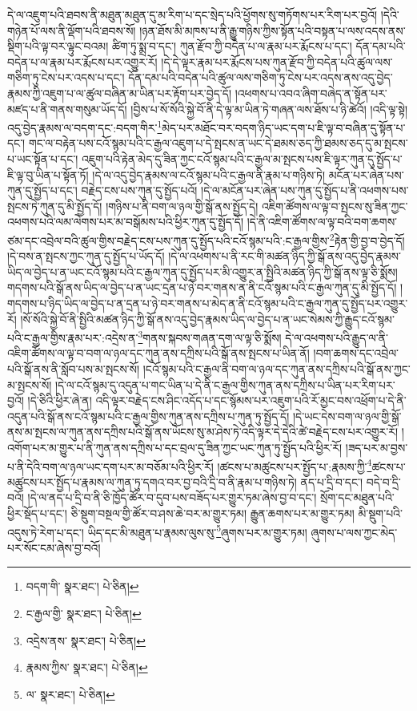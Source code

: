 དེ་ལ་འཇུག་པའི་ཐབས་ནི་མཐུན་མཐུན་དུ་མ་རིག་པ་དང་སྲེད་པའི་ཕྱོགས་སུ་གཏོགས་པར་རིག་པར་བྱའོ། །དེའི་གཉེན་པོ་ལས་ནི་ལྡོག་པའི་ཐབས་སོ། །ཉན་ཐོས་མི་མཁས་པ་ནི་རྒྱུ་གཉིས་ཀྱིས་སྟོན་པའི་བསྟན་པ་ལས་འདས་ནས་སྡིག་པའི་ལྟ་བར་ལྟུང་བའམ། ཚིག་ཏུ་སྨྲ་བ་དང་། ཀུན་རྫོབ་ཀྱི་བདེན་པ་ལ་རྣམ་པར་རྨོངས་པ་དང་། དོན་དམ་པའི་བདེན་པ་ལ་རྣམ་པར་རྨོངས་པར་འགྱུར་རོ། །དེ་དེ་ལྟར་རྣམ་པར་རྨོངས་པས་ཀུན་རྫོབ་ཀྱི་བདེན་པའི་ཚུལ་ལས་གཅིག་ཏུ་ངེས་པར་འདས་པ་དང་། དོན་དམ་པའི་བདེན་པའི་ཚུལ་ལས་གཅིག་ཏུ་ངེས་པར་འདས་ནས་འདུ་བྱེད་རྣམས་ཀྱི་འཇུག་པ་ལ་ཚུལ་བཞིན་མ་ཡིན་པར་རྟོག་པར་བྱེད་དོ། །འཕགས་པ་འབའ་ཞིག་བཞེད་ན་སྟོན་པར་མཛད་པ་ནི་གནས་གསུམ་ཡོད་དོ། །བྱིས་པ་སོ་སོའི་སྐྱེ་བོ་ནི་དེ་ལྟ་མ་ཡིན་ཏེ་གཞན་ལས་ཐོས་པ་ཉི་ཚེའོ། །འདི་ལྟ་སྟེ། འདུ་བྱེད་རྣམས་ལ་བདག་དང་:བདག་གིར་\footnote{བདག་གི་  སྣར་ཐང་།  པེ་ཅིན། }མེད་པར་མཐོང་བར་བདག་ཉིད་ཡང་དག་པ་ཇི་ལྟ་བ་བཞིན་དུ་སྟོན་པ་དང་། གང་ལ་བརྟེན་པས་ངའོ་སྙམ་པའི་ང་རྒྱལ་འཇུག་པ་དེ་སྤངས་ན་ཡང་དེ་ཐམས་ཅད་ཀྱི་ཐམས་ཅད་དུ་མ་སྤངས་པ་ཡང་སྟོན་པ་དང་། འཇུག་པའི་རྟེན་མེད་དུ་ཟིན་ཀྱང་ངའོ་སྙམ་པའི་ང་རྒྱལ་མ་སྤངས་པས་ཇི་ལྟར་ཀུན་དུ་སྤྱོད་པ་ཇི་ལྟ་བུ་ཡིན་པ་སྟོན་ཏོ། །དེ་ལ་འདུ་བྱེད་རྣམས་ལ་ངའོ་སྙམ་པའི་ང་རྒྱལ་ནི་རྣམ་པ་གཉིས་ཏེ། མངོན་པར་ཞེན་པས་ཀུན་དུ་སྤྱོད་པ་དང་། བརྗེད་ངས་པས་ཀུན་དུ་སྤྱོད་པའོ། །དེ་ལ་མངོན་པར་ཞེན་པས་ཀུན་དུ་སྤྱོད་པ་ནི་འཕགས་པས་སྤངས་ཏེ་ཀུན་དུ་མི་སྤྱོད་དོ། །གཉིས་པ་ནི་བག་ལ་ཉལ་གྱི་སྒོ་ནས་སྤྱོད་དེ། འཇིག་ཚོགས་ལ་ལྟ་བ་སྤངས་སུ་ཟིན་ཀྱང་འཕགས་པའི་ལམ་ལེགས་པར་མ་བསྒོམས་པའི་ཕྱིར་ཀུན་དུ་སྤྱོད་དོ། །དེ་ནི་འཇིག་ཚོགས་ལ་ལྟ་བའི་བག་ཆགས་ཙམ་དང་འབྲེལ་བའི་ཚུལ་གྱིས་བརྗེད་ངས་པས་ཀུན་དུ་སྤྱོད་པའི་ངའོ་སྙམ་པའི་:ང་རྒྱལ་གྱིས་\footnote{ང་རྒྱལ་གྱི་  སྣར་ཐང་།  པེ་ཅིན། }རྟེན་གྱི་བྱ་བ་བྱེད་དོ། །དེ་བས་ན་སྤངས་ཀྱང་ཀུན་དུ་སྤྱོད་པ་ཡོད་དོ། །དེ་ལ་འཕགས་པ་ནི་རང་གི་མཚན་ཉིད་ཀྱི་སྒོ་ནས་འདུ་བྱེད་རྣམས་ཡིད་ལ་བྱེད་པ་ན་ཡང་ངའོ་སྙམ་པའི་ང་རྒྱལ་ཀུན་དུ་སྤྱོད་པར་མི་འགྱུར་ན་སྤྱིའི་མཚན་ཉིད་ཀྱི་སྒོ་ནས་ལྟ་ཅི་སྨོས། གདགས་པའི་སྒོ་ནས་ཡིད་ལ་བྱེད་པ་ན་ཡང་དྲན་པ་ཉེ་བར་གནས་ན་ནི་ངའོ་སྙམ་པའི་ང་རྒྱལ་ཀུན་དུ་མི་སྤྱོད་དོ། །གདགས་པ་ཉིད་ཡིད་ལ་བྱེད་པ་ན་དྲན་པ་ཉེ་བར་གནས་པ་མེད་ན་ནི་ངའོ་སྙམ་པའི་ང་རྒྱལ་ཀུན་དུ་སྤྱོད་པར་འགྱུར་རོ། །སོ་སོའི་སྐྱེ་བོ་ནི་སྤྱིའི་མཚན་ཉིད་ཀྱི་སྒོ་ནས་འདུ་བྱེད་རྣམས་ཡིད་ལ་བྱེད་པ་ན་ཡང་སེམས་ཀྱི་རྒྱུད་ངའོ་སྙམ་པའི་ང་རྒྱལ་གྱིས་རྣམ་པར་:འདྲེས་ན་\footnote{འདྲེས་ནས་  སྣར་ཐང་།  པེ་ཅིན། }གནས་སྐབས་གཞན་དག་ལ་ལྟ་ཅི་སྨོས། དེ་ལ་འཕགས་པའི་རྒྱུད་ལ་ནི་འཇིག་ཚོགས་ལ་ལྟ་བ་བག་ལ་ཉལ་དང་ཀུན་ནས་དཀྲིས་པའི་སྒོ་ནས་སྤངས་པ་ཡིན་ནོ། །བག་ཆགས་དང་འབྲེལ་པའི་སྒོ་ནས་ནི་སློབ་པས་མ་སྤངས་སོ། །ངའོ་སྙམ་པའི་ང་རྒྱལ་ནི་བག་ལ་ཉལ་དང་ཀུན་ནས་དཀྲིས་པའི་སྒོ་ནས་ཀྱང་མ་སྤངས་སོ། །དེ་ལ་ངའོ་སྙམ་དུ་འདུན་པ་གང་ཡིན་པ་དེ་ནི་ང་རྒྱལ་གྱིས་ཀུན་ནས་དཀྲིས་པ་ཡིན་པར་རིག་པར་བྱའོ། །དེ་ཅིའི་ཕྱིར་ཞེ་ན། འདི་ལྟར་བརྗེད་ངས་ཤིང་འདོད་པ་དང་སྙོམས་པར་འཇུག་པའི་རོ་མྱང་བས་འཕྲོག་པ་དེ་ནི་འདུན་པའི་སྒོ་ནས་ངའོ་སྙམ་པའི་ང་རྒྱལ་གྱིས་ཀུན་ནས་དཀྲིས་པ་ཀུན་ཏུ་སྤྱོད་དོ། །དེ་ཡང་དེས་བག་ལ་ཉལ་གྱི་སྒོ་ནས་མ་སྤངས་ལ་ཀུན་ནས་དཀྲིས་པའི་སྒོ་ནས་ཡོངས་སུ་མ་ཤེས་ཏེ་འདི་ལྟར་དེ་དེའི་ཚེ་བརྗེད་ངས་པར་འགྱུར་རོ། །འགོག་པར་མ་གྱུར་པ་ནི་ཀུན་ནས་དཀྲིས་པ་དང་བྲལ་དུ་ཟིན་ཀྱང་ཡང་ཀུན་ཏུ་སྤྱོད་པའི་ཕྱིར་རོ། །ཟད་པར་མ་བྱས་པ་ནི་དེའི་བག་ལ་ཉལ་ཡང་དག་པར་མ་བཅོམ་པའི་ཕྱིར་རོ། །ཚངས་པ་མཚུངས་པར་སྤྱོད་པ་:རྣམས་ཀྱི་\footnote{རྣམས་ཀྱིས་  སྣར་ཐང་།  པེ་ཅིན། }ཚངས་པ་མཚུངས་པར་སྤྱོད་པ་རྣམས་ལ་ཀུན་ཏུ་དགའ་བར་བྱ་བའི་དྲི་བ་ནི་རྣམ་པ་གཉིས་ཏེ། ནད་པ་དྲི་བ་དང་། བདེ་བ་དྲི་བའོ། །དེ་ལ་ནད་པ་དྲི་བ་ནི་ཅི་ཁྱོད་ཚོར་བ་དུབ་པས་བཟོད་པར་གྱུར་ཏམ་ཞེས་བྱ་བ་དང་། སྲོག་དང་མཐུན་པའི་ཕྱིར་སྡོད་པ་དང་། ཅི་སྡུག་བསྔལ་གྱི་ཚོར་བ་ཤས་ཆེ་བར་མ་གྱུར་ཏམ། རྒྱུན་ཆགས་པར་མ་གྱུར་ཏམ། མི་སྡུག་པའི་འདུས་ཏེ་རེག་པ་དང་། ཡིད་དང་མི་མཐུན་པ་རྣམས་ལུས་སུ་\footnote{ལ་  སྣར་ཐང་།  པེ་ཅིན། }ཞུགས་པར་མ་གྱུར་ཏམ། ཞུགས་པ་ལས་ཀྱང་མེད་པར་སོང་ངམ་ཞེས་བྱ་བའོ། 
